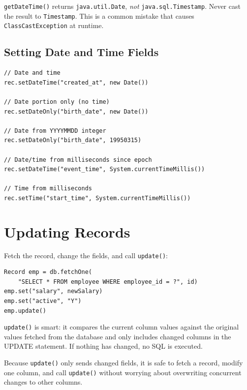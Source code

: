 \begin{warnbox}
\texttt{getDateTime()} returns \texttt{java.util.Date}, \emph{not} \texttt{java.sql.Timestamp}.  Never cast the result to \texttt{Timestamp}.  This is a common mistake that causes \texttt{ClassCastException} at runtime.
\end{warnbox}

\subsection{Setting Date and Time Fields}

\begin{lstlisting}[style=groovy]
// Date and time
rec.setDateTime("created_at", new Date())

// Date portion only (no time)
rec.setDateOnly("birth_date", new Date())

// Date from YYYYMMDD integer
rec.setDateOnly("birth_date", 19950315)

// Date/time from milliseconds since epoch
rec.setDateTime("event_time", System.currentTimeMillis())

// Time from milliseconds
rec.setTime("start_time", System.currentTimeMillis())
\end{lstlisting}

\section{Updating Records}
\label{sec:crud-update}

Fetch the record, change the fields, and call \texttt{update()}:

\begin{lstlisting}[style=groovy]
Record emp = db.fetchOne(
    "SELECT * FROM employee WHERE employee_id = ?", id)
emp.set("salary", newSalary)
emp.set("active", "Y")
emp.update()
\end{lstlisting}

\noindent
\texttt{update()} is smart: it compares the current column values against the original values fetched from the database and only includes changed columns in the UPDATE statement.  If nothing has changed, no SQL is executed.

\begin{tipbox}
Because \texttt{update()} only sends changed fields, it is safe to fetch a record, modify one column, and call \texttt{update()} without worrying about overwriting concurrent changes to other columns.
\end{tipbox}

